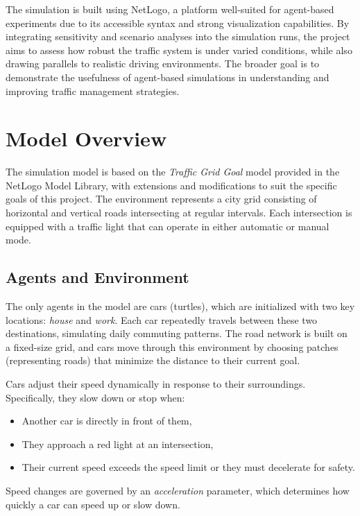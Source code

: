 \documentclass[12pt]{article}
\begin{document}
The simulation is built using NetLogo, a platform well-suited for agent-based experiments due to its accessible syntax and strong visualization capabilities. By integrating sensitivity and scenario analyses into the simulation runs, the project aims to assess how robust the traffic system is under varied conditions, while also drawing parallels to realistic driving environments. The broader goal is to demonstrate the usefulness of agent-based simulations in understanding and improving traffic management strategies.

\newpage
\section{Model Overview}

The simulation model is based on the \textit{Traffic Grid Goal} model provided in the NetLogo Model Library, with extensions and modifications to suit the specific goals of this project. The environment represents a city grid consisting of horizontal and vertical roads intersecting at regular intervals. Each intersection is equipped with a traffic light that can operate in either automatic or manual mode.

\subsection{Agents and Environment}

The only agents in the model are cars (turtles), which are initialized with two key locations: \textit{house} and \textit{work}. Each car repeatedly travels between these two destinations, simulating daily commuting patterns. The road network is built on a fixed-size grid, and cars move through this environment by choosing patches (representing roads) that minimize the distance to their current goal.

Cars adjust their speed dynamically in response to their surroundings. Specifically, they slow down or stop when:
\begin{itemize}
    \item Another car is directly in front of them,
    \item They approach a red light at an intersection,
    \item Their current speed exceeds the speed limit or they must decelerate for safety.
\end{itemize}
Speed changes are governed by an \textit{acceleration} parameter, which determines how quickly a car can speed up or slow down.
\end{document}
